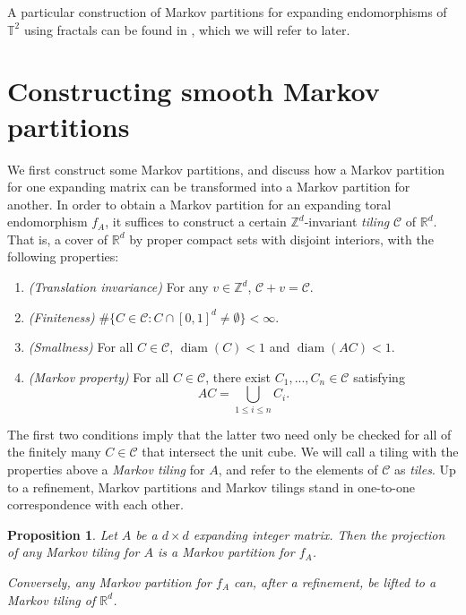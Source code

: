\documentclass{article}
\def\R{\mathbb{R}}
\def\Z{\mathbb{Z}}
\def\T{\mathbb{T}}
\def\diam{\operatorname{diam}}
\newtheorem{proposition}[theorem]{Proposition}
\begin{document}
A particular construction of Markov partitions for expanding endomorphisms of $\T^2$ using fractals can be found in \cite{Be}, which we will refer to later. 





\section{Constructing smooth Markov partitions} \label{Section:Constructions}

We first construct some Markov partitions, and discuss how a Markov partition for one expanding matrix can be transformed into a Markov partition for another. In order to obtain a Markov partition for an expanding toral endomorphism $f_A$, it suffices to construct a certain $\Z^d$-invariant \textit{tiling} $\mathcal{C}$ of $\R^d$. That is, a cover of $\R^d$ by proper compact sets with disjoint interiors, with the following properties: \begin{enumerate}
    \item \textit{(Translation invariance)} For any $v\in \Z^d$, $\mathcal{C}+v=\mathcal{C}$.
    \item \textit{(Finiteness)} $\#\{C\in \mathcal{C}:C\cap[0,1]^d\neq \emptyset\}<\infty.$
    \item \textit{(Smallness)} For all $C\in\mathcal{C}$, $\diam(C)<1$ and $\operatorname{diam}(AC)<1.$
    \item \textit{(Markov property)} For all $C\in\mathcal{C}$, there exist $C_1,...,C_n\in \mathcal{C}$ satisfying $$AC=\bigcup_{1\leq i\leq n} C_i.$$ 
\end{enumerate}

The first two conditions imply that the latter two need only be checked for all of the finitely many $C\in \mathcal{C}$ that intersect the unit cube. We will call a tiling with the properties above a \textit{Markov tiling} for $A$, and refer to the elements of $\mathcal{C}$ as \textit{tiles}. Up to a refinement, Markov partitions and Markov tilings stand in one-to-one correspondence with each other. 

\begin{proposition}\label{prop:MPs give Markov tilings}
    Let $A$ be a $d\times d$ expanding integer matrix. Then the projection of any Markov tiling for $A$ is a Markov partition for $f_A$. 

    Conversely, any Markov partition for $f_A$ can, after a refinement, be lifted to a Markov tiling of $\R^d$.
\end{proposition}
\end{document}
